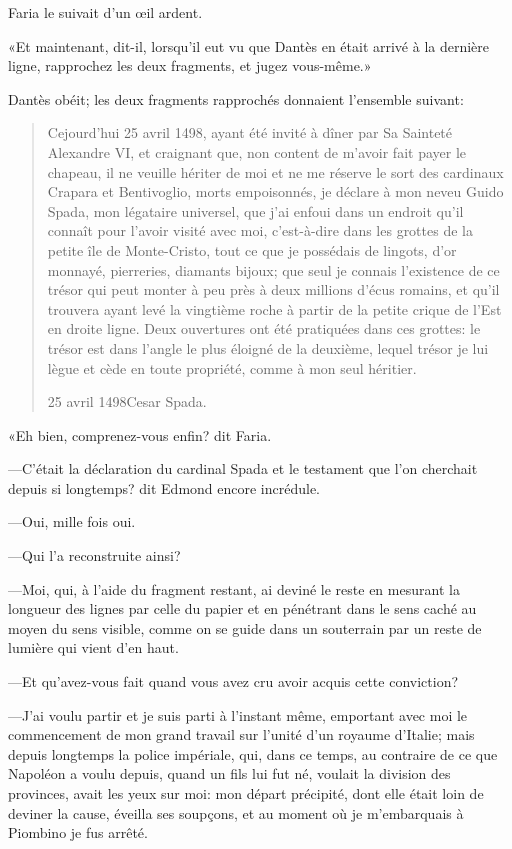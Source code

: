 Faria le suivait d'un œil ardent.

«Et maintenant, dit-il, lorsqu'il eut vu que Dantès en était arrivé à la dernière ligne, rapprochez les deux fragments, et jugez vous-même.»

Dantès obéit; les deux fragments rapprochés donnaient l'ensemble suivant:

\goodbreak
\begin{quotation}\oldfont	
Cejourd'hui 25 avril 1498, ayant été invité à dîner par Sa Sainteté Alexandre VI, et craignant que, non content de m'avoir fait payer le chapeau, il ne veuille hériter de moi et ne me réserve le sort des cardinaux Crapara et Bentivoglio, morts empoisonnés, je déclare à mon neveu Guido Spada, mon légataire universel, que j'ai enfoui dans un endroit qu'il connaît pour l'avoir visité avec moi, c'est-à-dire dans les grottes de la petite île de Monte-Cristo, tout ce que je possédais de lingots, d'or monnayé, pierreries, diamants bijoux; que seul je connais l'existence de ce trésor qui peut monter à peu près à deux millions d'écus romains, et qu'il trouvera ayant levé la vingtième roche à partir de la petite crique de l'Est en droite ligne. Deux ouvertures ont été pratiquées dans ces grottes: le trésor est dans l'angle le plus éloigné de la deuxième, lequel trésor je lui lègue et cède en toute propriété, comme à mon seul héritier.
\nopagebreak[1]

25 avril 1498\hfill Cesar Spada.
 \end{quotation}
\goodbreak

«Eh bien, comprenez-vous enfin? dit Faria.

—C'était la déclaration du cardinal Spada et le testament que l'on cherchait depuis si longtemps? dit Edmond encore incrédule.

—Oui, mille fois oui.

—Qui l'a reconstruite ainsi?

—Moi, qui, à l'aide du fragment restant, ai deviné le reste en mesurant la longueur des lignes par celle du papier et en pénétrant dans le sens caché au moyen du sens visible, comme on se guide dans un souterrain par un reste de lumière qui vient d'en haut.

—Et qu'avez-vous fait quand vous avez cru avoir acquis cette conviction?

—J'ai voulu partir et je suis parti à l'instant même, emportant avec moi le commencement de mon grand travail sur l'unité d'un royaume d'Italie; mais depuis longtemps la police impériale, qui, dans ce temps, au contraire de ce que Napoléon a voulu depuis, quand un fils lui fut né, voulait la division des provinces, avait les yeux sur moi: mon départ précipité, dont elle était loin de deviner la cause, éveilla ses soupçons, et au moment où je m'embarquais à Piombino je fus arrêté.

